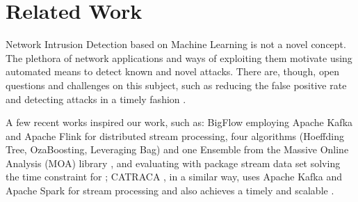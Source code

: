 
\section{Related Work}
\label{sec:related}

Network Intrusion Detection based on Machine Learning is not a novel concept.
The plethora of network applications and ways of exploiting them motivate using automated means to detect known and novel attacks. 
There are, though, open questions and challenges on this subject, such as
reducing the false positive rate and detecting attacks in a timely fashion \cite{DaCosta2019a}.

A few recent works inspired our work, such as: BigFlow \cite{Viegas2019}
employing Apache Kafka and Apache Flink for distributed stream processing,
four algorithms (Hoeffding Tree, OzaBoosting, Leveraging Bag) and one Ensemble
from the Massive Online Analysis (MOA) library \cite{MOA}, and
evaluating with package stream data set solving the time constraint for \nids;
CATRACA \cite{AndreoniLopez2018,AndreoniLopez2019}, in a similar way, uses 
Apache Kafka and Apache Spark for stream processing and also achieves
a timely and scalable \nids.


